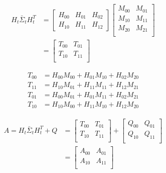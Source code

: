 \documentclass[oneside, 12pt, a4paper]{book}
\begin{document}
\begin{equation}
    \begin{split}
        H_t \bar{\Sigma}_t H_t^T &=
        \begin{bmatrix}
            H_{00} & H_{01} & H_{02} \\
            H_{10} & H_{11} & H_{12}
        \end{bmatrix}
        \begin{bmatrix}
            M_{00} & M_{01}\\
            M_{10} & M_{11}\\ 
            M_{20} & M_{21}\\
        \end{bmatrix}\\
        &= 
        \begin{bmatrix}
            T_{00} & T_{01}\\
            T_{10} & T_{11}\\ 
        \end{bmatrix}
    \end{split}
\end{equation}

\begin{equation}
    \begin{split}
        T_{00} &= H_{00}M_{00} + H_{01}M_{10} + H_{02}M_{20} \\
        T_{11} &= H_{10}M_{01} + H_{11}M_{11} + H_{12}M_{21} \\
        T_{01} &= H_{00}M_{01} + H_{01}M_{11} + H_{02}M_{21} \\
        T_{10} &= H_{10}M_{00} + H_{11}M_{10} + H_{12}M_{20}
    \end{split}
\end{equation}

\begin{equation}
    \begin{split}
        A = H_t \bar{\Sigma}_t H_t^T + Q
        &= 
        \begin{bmatrix}
            T_{00} & T_{01}\\
            T_{10} & T_{11}\\ 
        \end{bmatrix}
        +
        \begin{bmatrix}
            Q_{00} & Q_{01}\\
            Q_{10} & Q_{11}\\ 
        \end{bmatrix}\\
        &=
        \begin{bmatrix}
            A_{00} & A_{01}\\
            A_{10} & A_{11}\\ 
        \end{bmatrix}
    \end{split}
\end{equation}
\end{document}
